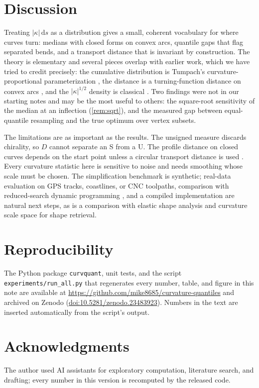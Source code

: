 \documentclass[11pt]{amsart}
\theoremstyle{definition}
\theoremstyle{remark}
\newcommand{\dd}{\,\mathrm{d}}
\newcommand{\repo}{\url{https://github.com/mike8685/curvature-quantiles}}
\begin{document}
\begin{table}[t]
\centering\small
\caption{Median wall-clock time (ms) of the reference implementations.}
\label{tab:timing}

\end{table}

\section{Discussion}\label{sec:discussion}

Treating $|\kappa|\dd s$ as a distribution gives a small, coherent vocabulary for where curves turn: medians with closed forms on convex arcs, quantile gaps that flag separated bends, and a transport distance that is invariant by construction. The theory is elementary and several pieces overlap with earlier work, which we have tried to credit precisely: the cumulative distribution is Tumpach's curvature-proportional parameterization \cite{tumpach2023canonical}, the distance is a turning-function distance on convex arcs \cite{arkin1991metric}, and the $|\kappa|^{1/2}$ density is classical \cite{mcclure1975}. Two findings were not in our starting notes and may be the most useful to others: the square-root sensitivity of the median at an inflection (\cref{rem:sqrt}), and the measured gap between equal-quantile resampling and the true optimum over vertex subsets.

The limitations are as important as the results. The unsigned measure discards chirality, so $D$ cannot separate an S from a U. The profile distance on closed curves depends on the start point unless a circular transport distance is used \cite{delon2009circle}. Every curvature statistic here is sensitive to noise and needs smoothing whose scale must be chosen. The simplification benchmark is synthetic; real-data evaluation on GPS tracks, coastlines, or CNC toolpaths, comparison with reduced-search dynamic programming \cite{kolesnikov2003}, and a compiled implementation are natural next steps, as is a comparison with elastic shape analysis \cite{srivastava2011elastic} and curvature scale space \cite{mokhtarian1992} for shape retrieval.

\section*{Reproducibility}
The Python package \texttt{curvquant}, unit tests, and the script \texttt{experiments/run\_all.py} that regenerates every number, table, and figure in this note are available at \repo{} and archived on Zenodo (\href{https://doi.org/10.5281/zenodo.23483923}{doi:10.5281/zenodo.23483923}). Numbers in the text are inserted automatically from the script's output.

\section*{Acknowledgments}
The author used AI assistants for exploratory computation, literature search, and drafting; every number in this version is recomputed by the released code.



\end{document}
